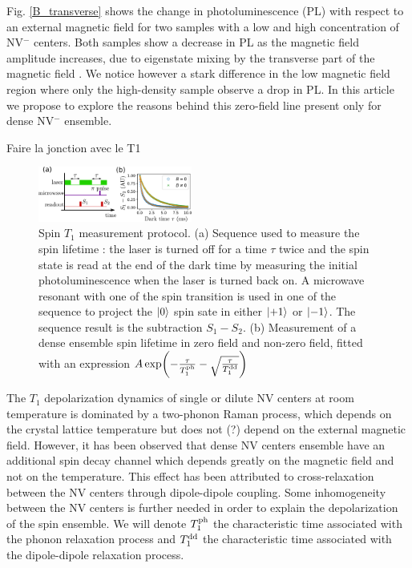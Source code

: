 \documentclass[preprintnumbers,amsmath,amssymb,superscriptaddress,twocolumn,showpacs]{revtex4-2}
\begin{document}
Fig. \ref{B_transverse} shows the change in photoluminescence (PL) with respect to an external magnetic field for two samples with a low and high concentration of NV$^-$ centers. Both samples show a decrease in PL as the magnetic field amplitude increases, due to eigenstate mixing by the transverse part of the magnetic field \citep{epstein2005anisotropic,lai2009influence}. We notice however a stark difference in the low magnetic field region where only the high-density sample observe a drop in PL. In this article we propose to explore the reasons behind this zero-field line present only for dense NV$^-$ ensemble.

Faire la jonction avec le T1

\begin{figure}
\includegraphics[width=0.45\textwidth]{Figures/fig T1}
\caption{Spin $T_1$ measurement protocol. (a) Sequence used to measure the spin lifetime : the laser is turned off for a time $\tau$ twice and the spin state is read at the end of the dark time by measuring the initial photoluminescence when the laser is turned back on. A microwave resonant with one of the spin transition is used in one of the sequence to project the $\ket{0}$ spin sate in either $\ket{+1}$ or $\ket{-1}$. The sequence result is the subtraction $S_1-S_2$. (b) Measurement of a dense ensemble spin lifetime in zero field and non-zero field, fitted with an expression $A \exp (-\frac{\tau}{T_1^{\rm ph}} -\sqrt{\frac{\tau}{T_1^{\rm dd}}})$}
\label{T1}
\end{figure}

The $T_1$ depolarization dynamics of single or dilute NV centers at room temperature is dominated by a two-phonon Raman process, which depends on the crystal lattice temperature but does not (?) depend on the external magnetic field. However, it has been observed that dense NV centers ensemble have an additional spin decay channel which depends greatly on the magnetic field and not on the temperature. This effect has been attributed to cross-relaxation between the NV centers through dipole-dipole coupling. Some inhomogeneity between the NV centers is further needed in order to explain the depolarization of the spin ensemble. We will denote $T_1^{\rm ph}$ the characteristic time associated with the phonon relaxation process and $T_1^{\rm dd}$ the characteristic time associated with the dipole-dipole relaxation process.
\end{document}
